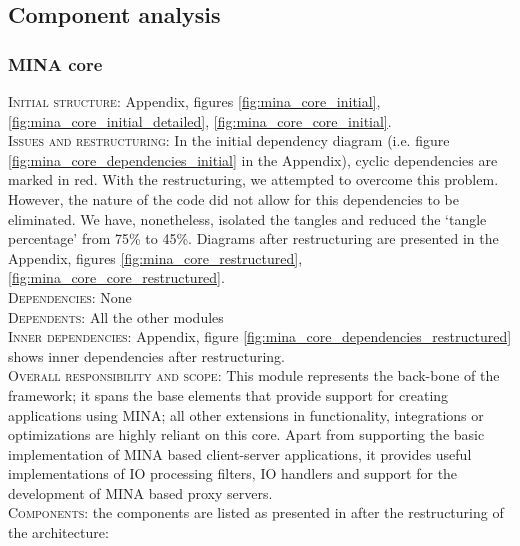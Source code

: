 \subsection{Component analysis}
\label{sec:component_analysis}
\subsubsection{MINA core}
\textsc{Initial structure}: Appendix, figures \ref{fig:mina_core_initial}, \ref{fig:mina_core_initial_detailed}, \ref{fig:mina_core_core_initial}.  \\
\textsc{Issues and restructuring}: In the initial dependency diagram (i.e. figure \ref{fig:mina_core_dependencies_initial} in the Appendix), cyclic dependencies are marked in red. With the restructuring, we attempted to overcome this problem. However, the nature of the code did not allow for this dependencies to be eliminated. We have, nonetheless, isolated the tangles and reduced the `tangle percentage' from 75\% to 45\%. Diagrams after restructuring are presented in the Appendix, figures \ref{fig:mina_core_restructured}, \ref{fig:mina_core_core_restructured}.\\
\textsc{Dependencies}: None \\
\textsc{Dependents}: All the other modules\\
\textsc{Inner dependencies}: Appendix, figure \ref{fig:mina_core_dependencies_restructured} shows inner dependencies after restructuring.\\
\textsc{Overall responsibility and scope}: This module represents the back-bone of the framework; it spans the base elements that provide support for creating applications using MINA; all other extensions in functionality, integrations or optimizations are highly reliant on this core. Apart from supporting the basic implementation of MINA based client-server applications, it provides useful implementations of IO processing filters, IO handlers and support for the development of MINA based proxy servers.\\
\textsc{Components}: the components are listed as presented in after the restructuring of the architecture:
